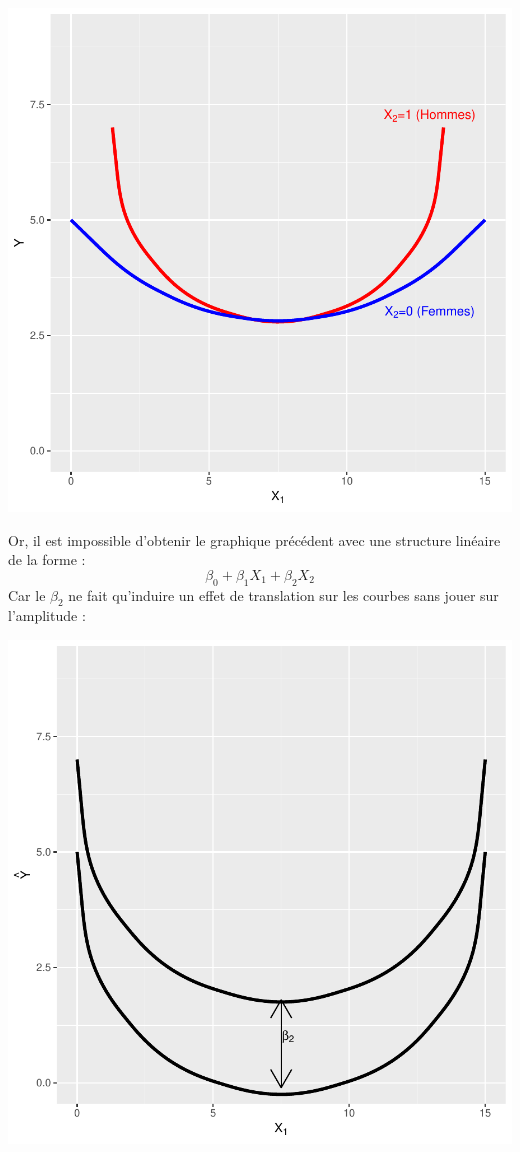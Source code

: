 \documentclass[11pt,french]{report}
\begin{document}
\includegraphics{notes_de_cours-044}

Or, il est impossible d'obtenir le graphique précédent avec une structure linéaire de la forme :
$$
\beta_0 + \beta_1X_1 + \beta_2X_2
$$
Car le $\beta_2$ ne fait qu'induire un effet de translation sur les courbes sans jouer sur l'amplitude :

\includegraphics{notes_de_cours-045}
\end{document}
